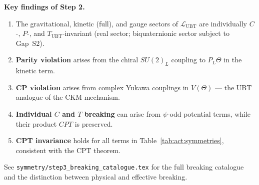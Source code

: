 \documentclass[12pt,a4paper]{article}
\theoremstyle{definition}
\theoremstyle{remark}
\begin{document}
\begin{resultbox}
\textbf{Key findings of Step 2.}
\begin{enumerate}
  \item The gravitational, kinetic (full), and gauge sectors of
    $\mathcal{L}_{\mathrm{UBT}}$ are individually $C$-, $P$-, and
    $T_{\mathrm{UBT}}$-invariant (real sector; biquaternionic sector subject to
    Gap~S2).
  \item \textbf{Parity violation} arises from the chiral
    $SU(2)_L$ coupling to $P_L\Theta$ in the kinetic term.
  \item \textbf{CP violation} arises from complex Yukawa couplings
    in $V(\Theta)$ --- the UBT analogue of the CKM mechanism.
  \item \textbf{Individual $C$ and $T$ breaking} can arise from
    $\psi$-odd potential terms, while their product $CPT$ is preserved.
  \item \textbf{CPT invariance} holds for all terms in
    Table~\ref{tab:act:symmetries}, consistent with the CPT theorem.
\end{enumerate}
See \texttt{symmetry/step3\_breaking\_catalogue.tex} for the full
breaking catalogue and the distinction between physical and effective breaking.
\end{resultbox}

\ifdefined\INCLUDEMODE
\else
  
\end{document}
